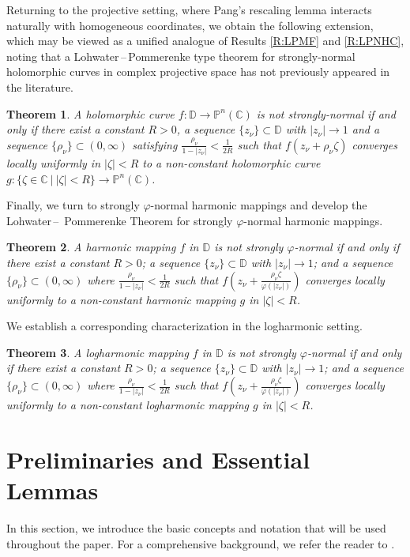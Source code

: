 \documentclass[11pt, reqno]{amsart}
\newtheorem{theorem}{Theorem}[section]
\theoremstyle{definition}
\theoremstyle{remark}
\numberwithin{equation}{section}
\begin{document}
Returning to the projective setting, where Pang’s 
rescaling lemma interacts naturally with homogeneous coordinates, we obtain the following extension, which may be viewed as a unified analogue of Results 
\ref{R:LPMF} and \ref{R:LPNHC}, noting that a Lohwater\,–\,Pommerenke type theorem for strongly-normal holomorphic curves in complex projective space 
has not previously appeared in the literature.
\begin{theorem} \label{T:LPSNHCPNC}
A holomorphic curve $f:\mathbb{D}\to \mathbb P^n(\mathbb C)$ is not strongly-normal if and only if
there exist a constant $R>0$, a sequence $\{z_{\nu}\}\subset \mathbb{D}$ with $|z_{\nu}|\to1$
and a sequence $\{\rho_{\nu} \}\subset (0,\infty)$ satisfying $\displaystyle\frac{\rho_{\nu} }{1-|z_{\nu}|}<\frac{1}{2R}$ such that 
${f(z_{\nu}+\rho_{\nu} \zeta)}$ converges locally uniformly in $|\zeta|<R$ to a non-constant holomorphic curve $g:\{\zeta\in\mathbb C\ |\ |\zeta|<R\}\to\mathbb P^n(\mathbb C)$.
\end{theorem}
Finally, we turn to strongly $\varphi$-normal harmonic mappings and develop the Lohwater\,--
\,Pommerenke Theorem for strongly $\varphi$-normal harmonic mappings.
\begin{theorem} \label{T:LPSPNHM}
A harmonic mapping $f$ in $\mathbb D$ is not strongly $\varphi$-normal if and only if there exist a 
constant $R>0$; a sequence $\{z_{\nu}\}\subset\mathbb D$ with $|z_{\nu}|\to1$; and a sequence $\{\rho_{\nu} \}\subset(0,\infty)$ where 
$\displaystyle\frac{\rho_{\nu} }{1-|z_{\nu}|}<\frac{1}{2R}$ such that $f\left(z_{\nu}+\frac{\rho_{\nu} \zeta}{\varphi(|z_{\nu}|)}\right)$ converges locally 
uniformly to a non-constant harmonic mapping $g$ in $|\zeta|<R$.
\end{theorem}
We establish a corresponding characterization in the logharmonic setting.
\begin{theorem} \label{T:LPSPNLHM}
A logharmonic mapping $f$ in $\mathbb D$ is not strongly $\varphi$-normal if and only if there exist 
a constant $R>0$; a sequence $\{z_{\nu}\}\subset\mathbb D$ with $|z_{\nu}|\to1$; and 
a sequence $\{\rho_{\nu} \}\subset(0,\infty)$ where $\displaystyle\frac{\rho_{\nu} }{1-|z_{\nu}|}<\frac{1}{2R}$ such that $f\left(z_{\nu}+\frac{\rho_{\nu} \zeta}{\varphi(|z_{\nu}|)}\right)$ converges locally 
uniformly 
to a non-constant logharmonic mapping $g$ in $|\zeta|<R$.
\end{theorem}
\section{Preliminaries and Essential Lemmas}
In this section, we introduce the basic concepts and notation that will be used throughout the paper. For 
a comprehensive background, we refer the reader to \cite{chang-csolmalbtc-2026, aljuain-cobtsohm-2019, anderson-obfanf-1974, arbelaez-nhm-2019,aulaskari-avotlptfsnf-2001,bohra-lfptfpnhm-2025,chen-osnf-1996,colonna-banfatr-1989,colonna-tbcobhm-1989,eremenko-nhcfprtps-2007,eremenko-bcoh-2008,jiang-nolm-2020,pang-aeostfnf-2015,quang-wnaqfohc-2018}.\smallskip
\end{document}
